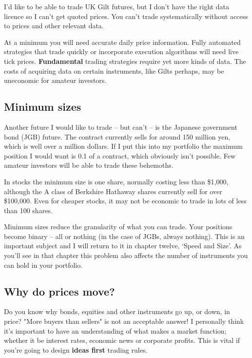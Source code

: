 I'd like to be able to trade UK Gilt futures, but I don't have the right data licence so I can't get quoted prices. You can't trade systematically without access to prices and other relevant data. 

At a minimum you will need accurate daily price information. Fully automated strategies that trade quickly or incorporate execution algorithms will need live tick prices. \textbf{Fundamental} trading strategies require yet more kinds of data. The costs of acquiring data on certain instruments, like Gilts perhaps, may be uneconomic for amateur investors.

\subsection*{Minimum sizes}

Another future I would like to trade -- but can't -- is the Japanese government bond (JGB) future. The contract currently sells for around 150 million yen, which is well over a million dollars. If I put this into my portfolio the maximum position I would want is 0.1 of a contract, which obviously isn't possible. Few amateur investors will be able to trade these behemoths.

In stocks the minimum size is one share, normally costing less than \$1,000, although the A class of Berkshire Hathaway shares currently sell for over \$100,000. Even for cheaper stocks, it may not be economic to trade in lots of less than 100 shares.

Minimum sizes reduce the granularity of what you can trade. Your positions become binary -- all or nothing (in the case of JGBs, always nothing). This is an important subject and I will return to it in chapter twelve, ‘Speed and Size'. As you'll see in that chapter this problem also affects the number of instruments you can hold in your portfolio.

\subsection*{Why do prices move?}

Do you know why bonds, equities and other instruments go up, or down, in price? "More buyers than sellers" is not an acceptable answer! I personally think it's important to have an understanding of what makes a market function; whether it be interest rates, economic news or corporate profits. This is vital if you're going to design \textbf{ideas first} trading rules.

